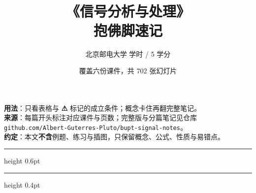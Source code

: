 \documentclass[UTF8,a4paper,zihao=5]{ctexart}
\title{\vspace{-1.2cm}\Huge\bfseries\color{accent}《信号分析与处理》\\[0.35em]
       \LARGE 抱佛脚速记}
\author{\normalsize 北京邮电大学 \quad 80 学时 / 5 学分}
\date{\normalsize 覆盖六份课件，共 702 张幻灯片}
\newcommand{\warn}[1]{\textcolor{red!70!black}{\textbf{#1}}}
\begin{document}
\maketitle
\thispagestyle{empty}
\vspace{-0.4cm}

\begin{center}
\begin{minipage}{0.92\linewidth}
\small\color{black!70}
\textbf{用法}：只看表格与 \warn{⚠} 标记的成立条件；概念卡住再翻完整笔记。\\
\textbf{来源}：每篇开头标注对应课件与页数；完整版与分篇笔记见仓库
\texttt{github.com/Albert-Guterres-Pluto/bupt-signal-notes}。\\
\textbf{约定}：本文\textbf{不含}例题、练习与插图，只保留概念、公式、性质与易错点。
\end{minipage}
\end{center}

\vspace{0.25cm}
\hrule height 0.6pt
\vspace{0.35cm}

\tableofcontents
\vspace{0.2cm}
\hrule height 0.4pt\color{rulegray}
\clearpage
\end{document}
